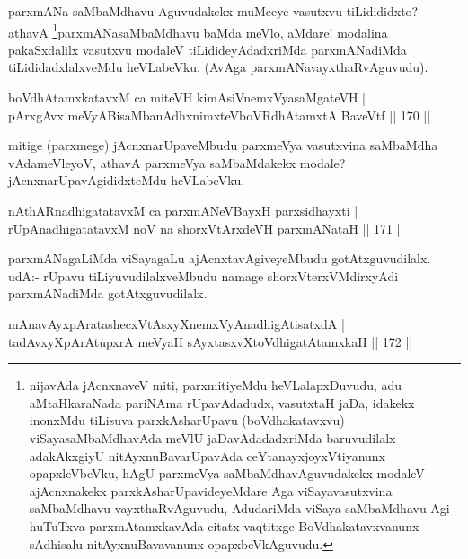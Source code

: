 \begin{artha}
parxmANa saMbaMdhavu Aguvudakekx muMceye vasutxvu tiLidididxto? athavA \footnote{nijavAda jAcnxnaveV miti, parxmitiyeMdu heVLalapxDuvudu, adu aMtaHkaraNada pariNAma rUpavAdadudx, vasutxtaH jaDa, idakekx inonxMdu tiLisuva parxkAsharUpavu (boVdhakatavxvu) viSayasaMbaMdhavAda meVlU jaDavAdadadxriMda baruvudilalx adakAkxgiyU nitAyxnuBavarUpavAda ceYtanayxjoyxVtiyanunx opapxleVbeVku, hAgU parxmeVya saMbaMdhavAguvudakekx modaleV ajAcnxnakekx parxkAsharUpavideyeMdare Aga viSayavasutxvina saMbaMdhavu vayxthaRvAguvudu, AdudariMda viSaya saMbaMdhavu Agi huTuTxva parxmAtamxkavAda citatx vaqtitxge BoVdhakatavxvanunx sAdhisalu nitAyxnuBavavanunx opapxbeVkAguvudu.}parxmANasaMbaMdhavu baMda meVlo, aMdare! modalina pakaSxdalilx vasutxvu modaleV tiLidideyAdadxriMda parxmANadiMda tiLididadxlalxveMdu heVLabeVku. (AvAga parxmANavayxthaRvAguvudu).
\end{artha}

\begin{shl}
boVdhAtamxkatavxM ca miteVH kimAsiVnemxVyasaMgateVH | \\
pArxgAvx meVyABisaMbanAdhxnimxteVboVRdhAtamxtA BaveVtf \hfill||  170 ||  
\end{shl}

\begin{artha}
mitige (parxmege) jAcnxnarUpaveMbudu parxmeVya vasutxvina saMbaMdha vAdameVleyoV, athavA parxmeVya saMbaMdakekx modale? jAcnxnarUpavAgididxteMdu heVLabeVku.
\end{artha}


\begin{shl}
nAthARnadhigatatavxM ca parxmANeVBayxH parxsidhayxti | \\
rUpAnadhigatatavxM noV na shorxVtArxdeVH parxmANataH \hfill||  171 ||  
\end{shl}

\begin{artha}
parxmANagaLiMda viSayagaLu ajAcnxtavAgiveyeMbudu gotAtxguvudilalx. udA:- rUpavu tiLiyuvudilalxveMbudu namage shorxVterxVMdirxyAdi parxmANadiMda gotAtxguvudilalx.
\end{artha}

\begin{shl}
mAnavAyxpAratashecxVtAsxyXnemxVyAnadhigAtisatxdA |  \\
tadAvxyXpArAtupxrA meVyaH sAyxtasxvXtoVdhigatAtamxkaH \hfill||  172 ||  
\end{shl}

